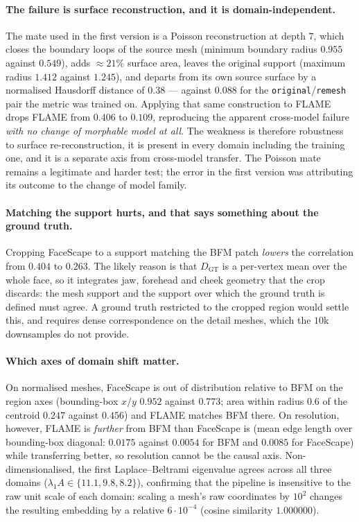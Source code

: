 \documentclass{article}
\begin{document}
\paragraph{The failure is surface reconstruction, and it is domain-independent.}
The mate used in the first version is a Poisson reconstruction at depth $7$, which closes
the boundary loops of the source mesh (minimum boundary radius $0.955$ against $0.549$),
adds $\approx21\%$ surface area, leaves the original support (maximum radius $1.412$
against $1.245$), and departs from its own source surface by a normalised Hausdorff
distance of $0.38$ --- against $0.088$ for the \texttt{original}/\texttt{remesh} pair the
metric was trained on. Applying that same construction to FLAME drops FLAME from $0.406$
to $0.109$, reproducing the apparent cross-model failure \emph{with no change of
morphable model at all}. The weakness is therefore robustness to surface
re-reconstruction, it is present in every domain including the training one, and it is a
separate axis from cross-model transfer. The Poisson mate remains a legitimate and
harder test; the error in the first version was attributing its outcome to the change of
model family.

\paragraph{Matching the support hurts, and that says something about the ground truth.}
Cropping FaceScape to a support matching the BFM patch \emph{lowers} the correlation from
$0.404$ to $0.263$. The likely reason is that $D_{\mathrm{GT}}$ is a per-vertex mean over
the whole face, so it integrates jaw, forehead and cheek geometry that the crop discards:
the mesh support and the support over which the ground truth is defined must agree. A
ground truth restricted to the cropped region would settle this, and requires dense
correspondence on the detail meshes, which the $10$k downsamples do not provide.

\paragraph{Which axes of domain shift matter.}
On normalised meshes, FaceScape is out of distribution relative to BFM on the region
axes (bounding-box $x/y$ $0.952$ against $0.773$; area within radius $0.6$ of the
centroid $0.247$ against $0.456$) and FLAME matches BFM there. On resolution, however,
FLAME is \emph{further} from BFM than FaceScape is (mean edge length over bounding-box
diagonal: $0.0175$ against $0.0054$ for BFM and $0.0085$ for FaceScape) while
transferring better, so resolution cannot be the causal axis. Non-dimensionalised, the
first Laplace--Beltrami eigenvalue agrees across all three domains
($\lambda_1 A \in \{11.1, 9.8, 8.2\}$), confirming that the pipeline is insensitive to
the raw unit scale of each domain: scaling a mesh's raw coordinates by $10^2$ changes the
resulting embedding by a relative $6\cdot10^{-4}$ (cosine similarity $1.000000$).
\end{document}
